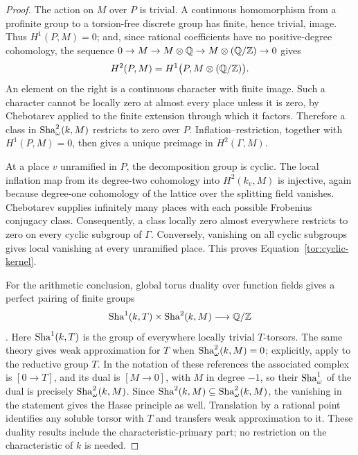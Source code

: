 \begin{proof}
The action on $M$ over $P$ is trivial.  A continuous homomorphism
from a profinite group to a torsion-free discrete group has finite,
hence trivial, image.  Thus $H^1(P,M)=0$; and, since rational
coefficients have no positive-degree cohomology, the sequence
$0\to M\to M\otimes\mathbb Q\to M\otimes(\mathbb Q/\mathbb Z)\to0$ gives
\[
 H^2(P,M)=H^1\bigl(P,M\otimes(\mathbb Q/\mathbb Z)\bigr).
\]
An element on the right is a continuous character with finite image.
Such a character cannot be locally zero at almost every place
unless it is zero, by Chebotarev applied to the finite extension
through which it factors.  Therefore a class in
$\operatorname{Sha}^2_\omega(k,M)$ restricts to zero over $P$.  Inflation--restriction,
together with $H^1(P,M)=0$, then gives a unique preimage in
$H^2(\Gamma,M)$.

At a place $v$ unramified in $P$, the decomposition group is cyclic.
The local inflation map from its degree-two cohomology into
$H^2(k_v,M)$ is injective, again because degree-one cohomology of
the lattice over the splitting field vanishes.  Chebotarev supplies
infinitely many places with each possible Frobenius conjugacy class.
Consequently, a class locally zero almost everywhere restricts to
zero on every cyclic subgroup of $\Gamma$.  Conversely, vanishing
on all cyclic subgroups gives local vanishing at every unramified
place.  This proves Equation~\eqref{tor:cyclic-kernel}.

For the arithmetic conclusion, global torus duality over function
fields gives a perfect pairing of finite groups
\[
                  \operatorname{Sha}^1(k,T)\times\operatorname{Sha}^2(k,M)
                                  \longrightarrow\mathbb Q/\mathbb Z
\]
\cite[Theorem~5.2]{DemarcheHarariDuality}.
Here $\operatorname{Sha}^1(k,T)$ is the group of everywhere locally trivial
$T$-torsors.  The same theory gives weak approximation for $T$
when $\operatorname{Sha}^2_\omega(k,M)=0$; explicitly, apply
\cite[Corollary~4.5]{DemarcheHarariHomogeneous} to the reductive
group $T$.  In the notation of these references the associated
complex is $[0\to T]$, and its dual is $[M\to0]$, with $M$ in
degree $-1$, so their $\operatorname{Sha}^1_\omega$ of the dual is precisely
$\operatorname{Sha}^2_\omega(k,M)$.
Since $\operatorname{Sha}^2(k,M)\subseteq\operatorname{Sha}^2_\omega(k,M)$, the vanishing in
the statement gives the Hasse principle as well.  Translation by
a rational point identifies any soluble torsor with $T$ and
transfers weak approximation to it.  These duality results include
the characteristic-primary part; no restriction on the
characteristic of $k$ is needed.
\end{proof}

